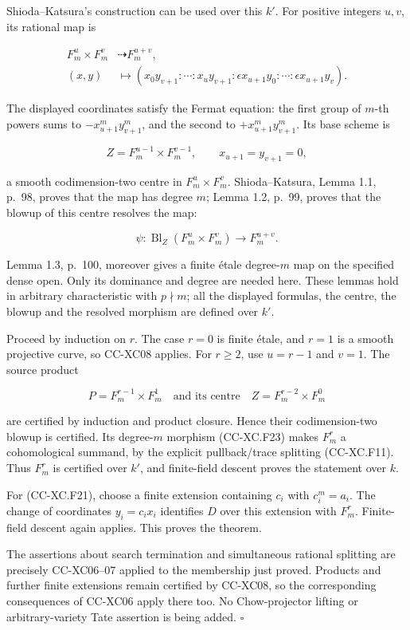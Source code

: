 Shioda--Katsura's construction can be used over this \(k'\). For
positive integers \(u,v\), its rational map is

\[
 \begin{split}
 F_m^u\times F_m^v&\dashrightarrow F_m^{u+v},\\
 (x,y)&\longmapsto
 (x_0y_{v+1}:\cdots:x_uy_{v+1}:
   \epsilon x_{u+1}y_0:\cdots:\epsilon x_{u+1}y_v).
 \end{split}
 \tag{CC-XC.F22}
\]

The displayed coordinates satisfy the Fermat equation: the first group
of \(m\)-th powers sums to \(-x_{u+1}^m y_{v+1}^m\), and the second to
\(+x_{u+1}^m y_{v+1}^m\). Its base scheme is

\[
 Z=F_m^{u-1}\times F_m^{v-1},
 \qquad x_{u+1}=y_{v+1}=0,
\]

a smooth codimension-two centre in \(F_m^u\times F_m^v\).
Shioda--Katsura, Lemma 1.1, p.~98, proves that the map has degree \(m\);
Lemma 1.2, p.~99, proves that the blowup of this centre resolves the
map:

\[
 \psi:\operatorname{Bl}_{Z}(F_m^u\times F_m^v)
       \longrightarrow F_m^{u+v}.
 \tag{CC-XC.F23}
\]

Lemma 1.3, p.~100, moreover gives a finite étale degree-\(m\) map on the
specified dense open. Only its dominance and degree are needed here.
These lemmas hold in arbitrary characteristic with \(p\nmid m\); all the
displayed formulas, the centre, the blowup and the resolved morphism are
defined over \(k'\).

Proceed by induction on \(r\). The case \(r=0\) is finite étale, and
\(r=1\) is a smooth projective curve, so CC-XC08 applies. For \(r\ge2\),
use \(u=r-1\) and \(v=1\). The source product

\[
 P=F_m^{r-1}\times F_m^1
 \quad\text{and its centre}\quad
 Z=F_m^{r-2}\times F_m^0
\]

are certified by induction and product closure. Hence their
codimension-two blowup is certified. Its degree-\(m\) morphism
(CC-XC.F23) makes \(F_m^r\) a cohomological summand, by the explicit
pullback/trace splitting (CC-XC.F11). Thus \(F_m^r\) is certified over
\(k'\), and finite-field descent proves the statement over \(k\).

For (CC-XC.F21), choose a finite extension containing \(c_i\) with
\(c_i^m=a_i\). The change of coordinates \(y_i=c_i x_i\) identifies
\(D\) over this extension with \(F_m^r\). Finite-field descent again
applies. This proves the theorem.

The assertions about search termination and simultaneous rational
splitting are precisely CC-XC06--07 applied to the membership just
proved. Products and further finite extensions remain certified by
CC-XC08, so the corresponding consequences of CC-XC06 apply there too.
No Chow-projector lifting or arbitrary-variety Tate assertion is being
added. \(\square\)

